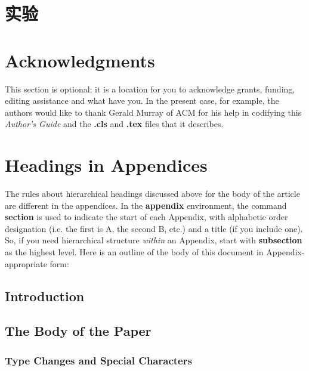 \documentclass{acm_proc_article-sp}
\begin{document}
\section{实验}

\section{Acknowledgments}
This section is optional; it is a location for you
to acknowledge grants, funding, editing assistance and
what have you.  In the present case, for example, the
authors would like to thank Gerald Murray of ACM for
his help in codifying this \textit{Author's Guide}
and the \textbf{.cls} and \textbf{.tex} files that it describes.

%

%
%
\appendix
\section{Headings in Appendices}
The rules about hierarchical headings discussed above for
the body of the article are different in the appendices.
In the \textbf{appendix} environment, the command
\textbf{section} is used to
indicate the start of each Appendix, with alphabetic order
designation (i.e. the first is A, the second B, etc.) and
a title (if you include one).  So, if you need
hierarchical structure
\textit{within} an Appendix, start with \textbf{subsection} as the
highest level. Here is an outline of the body of this
document in Appendix-appropriate form:
\subsection{Introduction}
\subsection{The Body of the Paper}
\subsubsection{Type Changes and  Special Characters}
\end{document}
